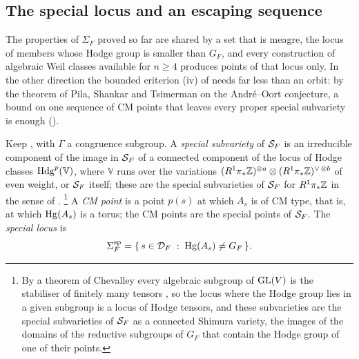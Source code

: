 \subsection{The special locus and an escaping sequence}
\label{ssec:speciallocus}

The properties of $\Sigma_{F}$ proved so far are shared by a set that is
meagre, the locus of members whose Hodge group is smaller than
$G_{F}$, and every construction of algebraic Weil classes available for
$n\ge4$ produces points of that locus only. In the other direction the
bounded criterion (iv) of  needs far less than an
orbit: by the theorem of Pila, Shankar and Tsimerman on the Andr\'e--Oort
conjecture, a bound on one sequence of CM points that leaves every proper
special subvariety is enough ().

\begin{definition}
\label{def:speciallocus}
Keep , with $\Gamma$ a congruence subgroup. A
\emph{special subvariety} of $\mathcal{S}_{F}$ is an irreducible component of the
image in $\mathcal{S}_{F}$ of a connected component of the locus of Hodge classes
$\mathrm{Hdg}^{p}(\mathbb{V})$, where $\mathbb{V}$ runs over the variations
$(R^{1}\pi_{*}\mathbb{Z})^{\otimes a}\otimes(R^{1}\pi_{*}\mathbb{Z})^{\vee\,\otimes b}$
of even weight, or $\mathcal{S}_{F}$ itself; these are the special subvarieties of
$\mathcal{S}_{F}$ for $R^{1}\pi_{*}\mathbb{Z}$ in the sense of \cite{KOU}.%
\footnote{By a theorem of Chevalley every algebraic subgroup of $\operatorname{GL}(V)$ is
the stabiliser of finitely many tensors \cite[\S3]{Del82}, so the locus where
the Hodge group lies in a given subgroup is a locus of Hodge tensors, and
these subvarieties are the special subvarieties of $\mathcal{S}_{F}$ as a connected
Shimura variety, the images of the domains of the reductive subgroups of
$G_{F}$ that contain the Hodge group of one of their points.}
A \emph{CM point} is a point $p(s)$ at which $A_{s}$ is of CM type, that is,
at which $\operatorname{Hg}(A_{s})$ is a torus; the CM points are the special points of
$\mathcal{S}_{F}$. The \emph{special locus} is
\[
  \Sigma^{\mathrm{sp}}_{F}
  =\{\,s\in\mathcal{D}_{F}\;:\;\operatorname{Hg}(A_{s})\ne G_{F}\,\}.
\]
\end{definition}

